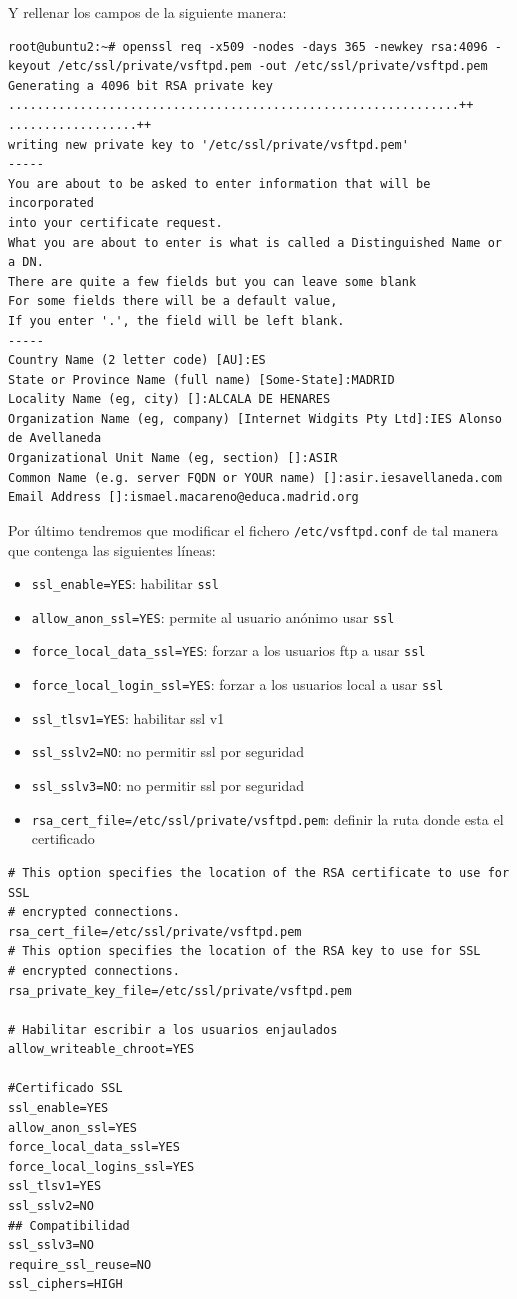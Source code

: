 \documentclass[11pt]{article}
\begin{document}
Y rellenar los campos de la siguiente manera:
\begin{verbatim}
root@ubuntu2:~# openssl req -x509 -nodes -days 365 -newkey rsa:4096 -keyout /etc/ssl/private/vsftpd.pem -out /etc/ssl/private/vsftpd.pem
Generating a 4096 bit RSA private key
...............................................................++
..................++
writing new private key to '/etc/ssl/private/vsftpd.pem'
-----
You are about to be asked to enter information that will be incorporated
into your certificate request.
What you are about to enter is what is called a Distinguished Name or a DN.
There are quite a few fields but you can leave some blank
For some fields there will be a default value,
If you enter '.', the field will be left blank.
-----
Country Name (2 letter code) [AU]:ES
State or Province Name (full name) [Some-State]:MADRID
Locality Name (eg, city) []:ALCALA DE HENARES
Organization Name (eg, company) [Internet Widgits Pty Ltd]:IES Alonso de Avellaneda
Organizational Unit Name (eg, section) []:ASIR
Common Name (e.g. server FQDN or YOUR name) []:asir.iesavellaneda.com
Email Address []:ismael.macareno@educa.madrid.org
\end{verbatim}

Por último tendremos que modificar el fichero \texttt{/etc/vsftpd.conf} de tal manera que contenga las siguientes líneas:
\begin{itemize}
\item \texttt{ssl\_enable=YES}: habilitar \texttt{ssl}
\item \texttt{allow\_anon\_ssl=YES}: permite al usuario anónimo usar \texttt{ssl}
\item \texttt{force\_local\_data\_ssl=YES}: forzar a los usuarios ftp a usar \texttt{ssl}
\item \texttt{force\_local\_login\_ssl=YES}: forzar a los usuarios local a usar \texttt{ssl}
\item \texttt{ssl\_tlsv1=YES}: habilitar ssl v1
\item \texttt{ssl\_sslv2=NO}: no permitir ssl por seguridad
\item \texttt{ssl\_sslv3=NO}: no permitir ssl por seguridad
\item \texttt{rsa\_cert\_file=/etc/ssl/private/vsftpd.pem}: definir la ruta donde esta el certificado
\end{itemize}


\begin{verbatim}
# This option specifies the location of the RSA certificate to use for SSL
# encrypted connections.
rsa_cert_file=/etc/ssl/private/vsftpd.pem
# This option specifies the location of the RSA key to use for SSL
# encrypted connections.
rsa_private_key_file=/etc/ssl/private/vsftpd.pem

# Habilitar escribir a los usuarios enjaulados
allow_writeable_chroot=YES

#Certificado SSL
ssl_enable=YES
allow_anon_ssl=YES
force_local_data_ssl=YES
force_local_logins_ssl=YES
ssl_tlsv1=YES
ssl_sslv2=NO
## Compatibilidad
ssl_sslv3=NO
require_ssl_reuse=NO
ssl_ciphers=HIGH
\end{verbatim}
\end{document}
